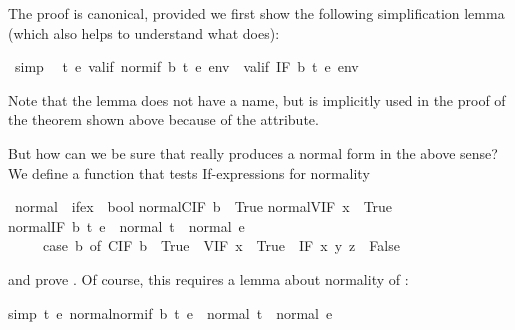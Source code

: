 \begin{isabellebody}
\begin{isamarkuptext}%
\noindent
The proof is canonical, provided we first show the following simplification
lemma (which also helps to understand what  does):%
\end{isamarkuptext}%
\ {\isacharbrackleft}simp{\isacharbrackright}{\isacharcolon}\isanewline
\ \ {\isachardoublequote}{\isasymforall}t\ e{\isachardot}\ valif\ {\isacharparenleft}normif\ b\ t\ e{\isacharparenright}\ env\ {\isacharequal}\ valif\ {\isacharparenleft}IF\ b\ t\ e{\isacharparenright}\ env{\isachardoublequote}%
\begin{isamarkuptext}%
\noindent
Note that the lemma does not have a name, but is implicitly used in the proof
of the theorem shown above because of the  attribute.

But how can we be sure that  really produces a normal form in
the above sense? We define a function that tests If-expressions for normality%
\end{isamarkuptext}%
\ normal\ {\isacharcolon}{\isacharcolon}\ {\isachardoublequote}ifex\ {\isasymRightarrow}\ bool{\isachardoublequote}\isanewline
{}\isanewline
{\isachardoublequote}normal{\isacharparenleft}CIF\ b{\isacharparenright}\ {\isacharequal}\ True{\isachardoublequote}\isanewline
{\isachardoublequote}normal{\isacharparenleft}VIF\ x{\isacharparenright}\ {\isacharequal}\ True{\isachardoublequote}\isanewline
{\isachardoublequote}normal{\isacharparenleft}IF\ b\ t\ e{\isacharparenright}\ {\isacharequal}\ {\isacharparenleft}normal\ t\ {\isasymand}\ normal\ e\ {\isasymand}\isanewline
\ \ \ \ \ {\isacharparenleft}case\ b\ of\ CIF\ b\ {\isasymRightarrow}\ True\ {\isacharbar}\ VIF\ x\ {\isasymRightarrow}\ True\ {\isacharbar}\ IF\ x\ y\ z\ {\isasymRightarrow}\ False{\isacharparenright}{\isacharparenright}{\isachardoublequote}%
\begin{isamarkuptext}%
\noindent
and prove . Of course, this requires a lemma about
normality of :%
\end{isamarkuptext}%
simp{\isacharbrackright}{\isacharcolon}\ {\isachardoublequote}{\isasymforall}t\ e{\isachardot}\ normal{\isacharparenleft}normif\ b\ t\ e{\isacharparenright}\ {\isacharequal}\ {\isacharparenleft}normal\ t\ {\isasymand}\ normal\ e{\isacharparenright}{\isachardoublequote}\end{isabellebody}%
